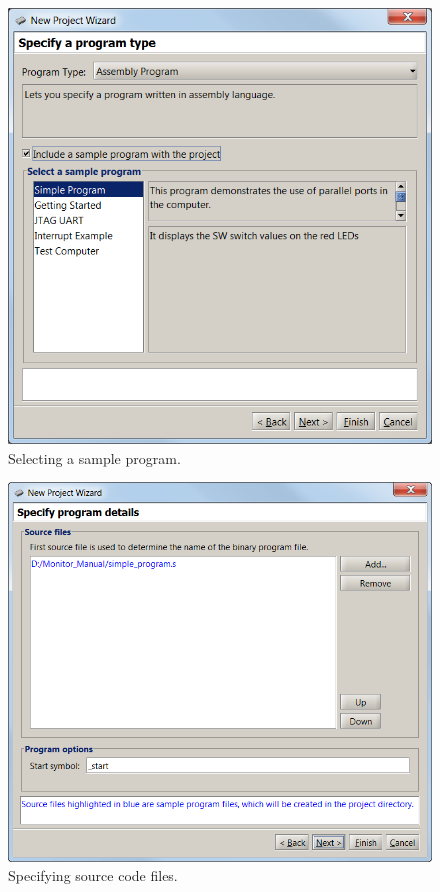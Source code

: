 \documentclass[11pt, twoside, pdftex]{article}
\begin{document}
\begin{figure}[H]
   \begin{center}
      \includegraphics[scale=1]{screenshots/figure9.png}
   \end{center}
   \caption{Selecting a sample program.} 
   \label{fig:NPW_sampleprograms}
\end{figure}

\begin{figure}[H]
   \begin{center} \includegraphics[scale=1]{screenshots/figure10.png}
   \end{center}
   \caption{Specifying source code files.} 
   \label{fig:NPW_sourcefiles}
\end{figure}
 
\end{document}
